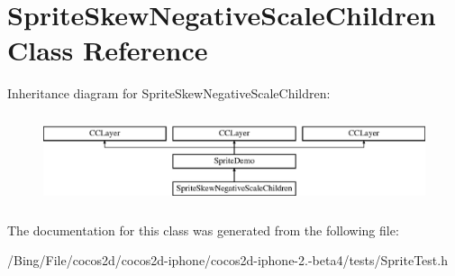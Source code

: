 \hypertarget{interface_sprite_skew_negative_scale_children}{\section{Sprite\-Skew\-Negative\-Scale\-Children Class Reference}
\label{interface_sprite_skew_negative_scale_children}
}
Inheritance diagram for Sprite\-Skew\-Negative\-Scale\-Children\-:\begin{figure}[H]
\begin{center}
\leavevmode
\includegraphics[height=2.629108cm]{interface_sprite_skew_negative_scale_children}
\end{center}
\end{figure}


The documentation for this class was generated from the following file\-:\begin{DoxyCompactItemize}
\item 
/\-Bing/\-File/cocos2d/cocos2d-\/iphone/cocos2d-\/iphone-\/2.-\/beta4/tests/Sprite\-Test.\-h\end{DoxyCompactItemize}
